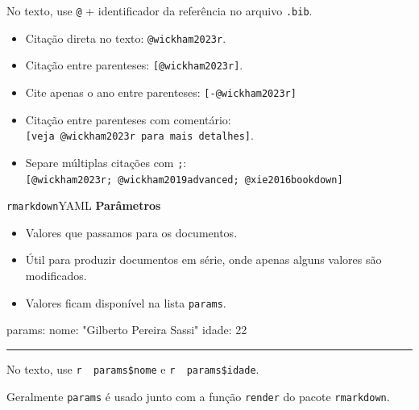 \documentclass[
  10pt,
  ignorenonframetext,
]{beamer}
\newenvironment{Shaded}{\begin{snugshade}}{\end{snugshade}}
\newcommand{\AttributeTok}[1]{\textcolor[rgb]{0.40,0.45,0.13}{#1}}
\newcommand{\DecValTok}[1]{\textcolor[rgb]{0.68,0.00,0.00}{#1}}
\newcommand{\FunctionTok}[1]{\textcolor[rgb]{0.28,0.35,0.67}{#1}}
\newcommand{\KeywordTok}[1]{\textcolor[rgb]{0.00,0.23,0.31}{#1}}
\newcommand{\StringTok}[1]{\textcolor[rgb]{0.13,0.47,0.30}{#1}}
\providecommand{\tightlist}{%
  \setlength{\itemsep}{0pt}\setlength{\parskip}{0pt}}\usepackage{longtable,booktabs,array}
\newcommand*{\regrafina}{\rule{\textwidth}{0.5pt}}
\begin{document}
\begin{frame}[fragile]
No texto, use \texttt{@} + identificador da referência no arquivo
\texttt{.bib}.

\begin{itemize}
\tightlist
\item
  Citação direta no texto: \texttt{@wickham2023r}.
\item
  Citação entre parenteses: \texttt{{[}@wickham2023r{]}}.
\item
  Cite apenas o ano entre parenteses: \texttt{{[}-@wickham2023r{]}}
\item
  Citação entre parenteses com comentário:
  \texttt{{[}veja\ @wickham2023r\ para\ mais\ detalhes{]}}.
\item
  Separe múltiplas citações com \texttt{;}:
  \texttt{{[}@wickham2023r;\ @wickham2019advanced;\ @xie2016bookdown{]}}
\end{itemize}
\end{frame}

\begin{frame}[fragile]{\texttt{rmarkdown}\newline YAML}
\protect\hypertarget{rmarkdownyaml-2}{}
\textbf{Parâmetros}

\begin{itemize}
\tightlist
\item
  Valores que passamos para os documentos.
\item
  Útil para produzir documentos em série, onde apenas alguns valores são
  modificados.
\item
  Valores ficam disponível na lista \texttt{params}.
\end{itemize}

\begin{Shaded}
\begin{Highlighting}[]
\FunctionTok{params}\KeywordTok{:}
\AttributeTok{  }\FunctionTok{nome}\KeywordTok{:}\AttributeTok{ }\StringTok{"Gilberto Pereira Sassi"}
\AttributeTok{  }\FunctionTok{idade}\KeywordTok{:}\AttributeTok{ }\DecValTok{22}
\end{Highlighting}
\end{Shaded}

\regrafina

No texto, use
\texttt{\textasciigrave{}r\ \ params\$nome\textasciigrave{}} e
\texttt{\textasciigrave{}r\ \ params\$idade\textasciigrave{}}.

Geralmente \texttt{params} é usado junto com a função \texttt{render} do
pacote \texttt{rmarkdown}.
\end{frame}
\end{document}
